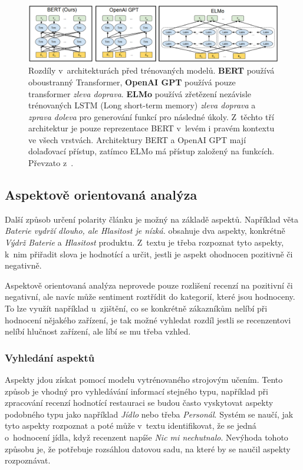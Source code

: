 \begin{figure}[h]
    \centering
    \includegraphics[width=150mm,scale=0.5]{obrazky-figures/Bert_porovnani.PNG}
    \caption{Rozdíly v~architekturách před trénovaných modelů. \textbf{BERT} používá oboustranný Transformer, \textbf{OpenAI GPT} používá pouze transformer \textit{zleva doprava}. \textbf{ELMo} používá zřetězení nezávisle trénovaných LSTM (Long short-term memory) \textit{zleva doprava} a \textit{zprava doleva} pro generování funkcí pro následné úkoly. Z~těchto tří architektur je pouze reprezentace BERT v~levém i pravém kontextu ve všech vrstvách. Architektury BERT a OpenAI GPT mají dolaďovací přístup, zatímco ELMo má přístup založený na funkcích. Převzato z~\cite{devlin2019bert}.}
    \label{fig:Bert_porovnani}
\end{figure}

\subsection*{Aspektově orientovaná analýza}

Další způsob určení polarity článku je možný na základě aspektů. Například věta \textit{Baterie vydrží dlouho, ale Hlasitost je nízká.} obsahuje dva aspekty, konkrétně \textit{Výdrž Baterie} a \textit{Hlasitost} produktu. Z~textu je třeba rozpoznat tyto aspekty, k~nim přiřadit slova je hodnotící a určit, jestli je aspekt ohodnocen pozitivně či negativně\cite{FITBT20346}.

Aspektově orientovaná analýza neprovede pouze rozlišení recenzí na pozitivní či negativní, ale navíc může sentiment roztřídit do kategorií, které jsou hodnoceny. To lze využít například u~zjištění, co se konkrétně zákazníkům nelíbí při hodnocení nějakého zařízení, je tak možné vyhledat rozdíl jestli se recenzentovi nelíbí hlučnost zařízení, ale líbí se mu třeba vzhled\cite{FITMT22451}.

\subsubsection*{Vyhledání aspektů}
Aspekty jdou získat pomocí modelu vytrénovaného strojovým učením. Tento způsob je vhodný pro vyhledávání informací stejného typu, například při zpracování recenzí hodnotící restauraci se budou často vyskytovat aspekty podobného typu jako například \textit{Jídlo} nebo třeba \textit{Personál}. Systém se naučí, jak tyto aspekty rozpoznat a poté může v~textu identifikovat, že se jedná o~hodnocení jídla, když recenzent napíše \textit{Nic mi nechutnalo}. Nevýhoda tohoto způsobu je, že potřebuje rozsáhlou datovou sadu, na které by se naučil aspekty rozpoznávat\cite{wang2015deep}.

